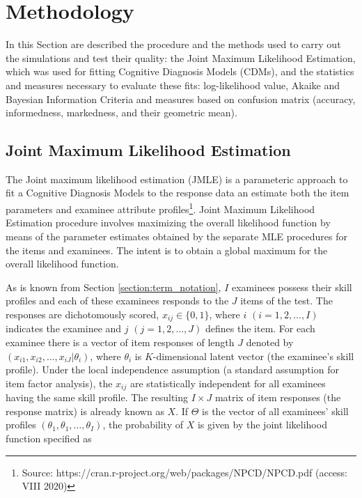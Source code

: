 \documentclass[english]{pwr_wmat_praca_dyplomowa}
\theoremstyle{plain}
\theoremstyle{definition}
\numberwithin{theorem}{chapter}
\begin{document}
\section{Methodology}

In this Section are described the procedure and the methods used to carry out the simulations and test their quality: the Joint Maximum Likelihood Estimation, which was used for fitting Cognitive Diagnosis Models (CDMs), and the statistics and measures necessary to evaluate these fits: log-likelihood value, Akaike and Bayesian Information Criteria and measures based on confusion matrix (accuracy, informedness, markedness, and their geometric mean).

\subsection{Joint Maximum Likelihood Estimation}

The Joint maximum likelihood estimation (JMLE) is a parameteric approach to fit a Cognitive Diagnosis Models to the response ﻿data an estimate both the item parameters and examinee attribute profiles\footnote{Source: https://cran.r-project.org/web/packages/NPCD/NPCD.pdf (access: VIII 2020)}. Joint Maximum Likelihood Estimation procedure involves maximizing the overall likelihood function by means of the parameter estimates obtained by the separate MLE procedures for the items and examinees. The intent is to obtain a global maximum for the overall likelihood function. 

As is known from Section \ref{section:term_notation}, $I$ examinees possess their skill profiles and each of these examinees responds to the $J$ items of the test. The responses are dichotomously scored, $x_{ij} \in \{0,1\}$, where $i$ $(i = 1, 2, \ldots, I)$ indicates the examinee and $j$ $( j = 1, 2, \ldots, J)$ defines the item. 
For each examinee there is a vector of item responses of length $J$ denoted by $(x_{i1}, x_{i2}, \ldots, x_{iJ} | \theta_i)$, where $\theta_i$ is $K$-dimensional latent vector (the examinee's skill profile). Under the local independence assumption (a standard assumption for item factor analysis), the $x_{ij}$ are statistically independent for all examinees having the same skill profile. The resulting $I \times J$ matrix of item responses (the response matrix) is already known as $X$. If $\Theta$ is the vector of all examinees' skill profiles $(\theta_1, \theta_1, \ldots, \theta_I)$, the probability of $X$ is given by the joint likelihood function specified \cite{jmle} as
\end{document}
